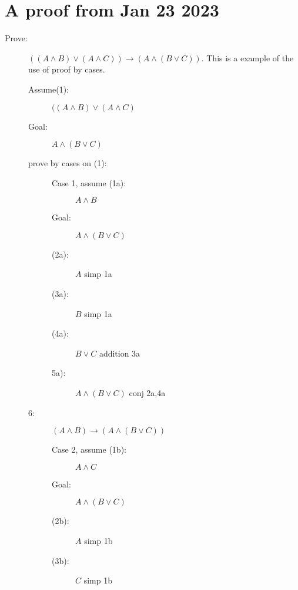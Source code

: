 \documentclass[12pt]{article}
\begin{document}
\newpage

\section{A proof from Jan 23 2023}

\begin{description}

\item[Prove:] $((A \wedge B) \vee (A \wedge C))\rightarrow (A \wedge (B \vee C))$.  This is a example of the use of proof by cases.

\begin{description}

\item[Assume(1):] $ ((A \wedge B) \vee (A \wedge C)$

\item[Goal:] $A \wedge (B \vee C)$

\item[prove by cases on (1):]

\begin{description}

\item [Case 1, assume (1a):]  $A \wedge B$

\item[Goal:]  $A \wedge (B \vee C)$

\item[(2a):]  $A$  simp 1a

\item[(3a):]  $B$ simp 1a

\item [(4a):]  $B \vee C$ addition 3a

\item [5a):]  $A \wedge (B \vee C)$  conj 2a,4a

\end{description}

\item[6:]  $(A \wedge B) \rightarrow (A \wedge( B \vee C))$

\begin{description}



\item [Case 2, assume (1b):]  $A \wedge C$

\item[Goal:]  $A \wedge (B \vee C)$

\item[(2b):]  $A$  simp 1b

\item[(3b):]  $C$ simp 1b


\end{description}
\end{description}
\end{description}
\end{document}
